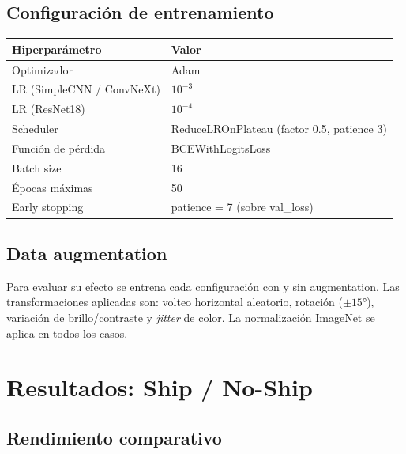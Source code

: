 \documentclass[11pt, a4paper]{article}
\begin{document}
\subsection{Configuración de entrenamiento}

\begin{center}
\begin{tabular}{ll}
\toprule
\textbf{Hiperparámetro} & \textbf{Valor} \\
\midrule
Optimizador         & Adam \\
LR (SimpleCNN / ConvNeXt) & $10^{-3}$ \\
LR (ResNet18)       & $10^{-4}$ \\
Scheduler           & ReduceLROnPlateau (factor 0.5, patience 3) \\
Función de pérdida  & BCEWithLogitsLoss \\
Batch size          & 16 \\
Épocas máximas      & 50 \\
Early stopping      & patience = 7 (sobre val\_loss) \\
\bottomrule
\end{tabular}
\end{center}

\subsection{Data augmentation}

Para evaluar su efecto se entrena cada configuración con y sin augmentation.
Las transformaciones aplicadas son: volteo horizontal aleatorio, rotación
($\pm15°$), variación de brillo/contraste y \textit{jitter} de color. La
normalización ImageNet se aplica en todos los casos.

\section{Resultados: Ship / No-Ship}

\subsection{Rendimiento comparativo}
\end{document}
